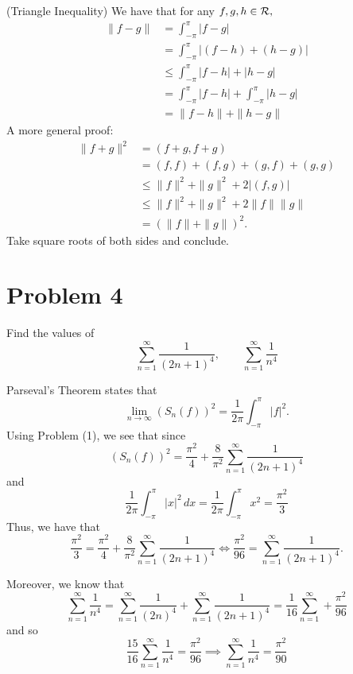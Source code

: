 \documentclass[11pt]{article}
\begin{document}
\begin{solution}
(Triangle Inequality) 
We have that for any $f,g,h \in \cal R,$
\begin{align*}
    \|f - g\| &= \int_{-\pi}^\pi |f - g|\\
    &= \int_{-\pi}^\pi |(f - h) + (h -g)|\\
    &\leq \int_{-\pi}^\pi |f - h| + |h - g|\\
    &= \int_{-\pi}^\pi |f - h| + \int_{-\pi}^\pi |h-g|\\
    &= \|f - h\| + \|h - g\|
\end{align*}
A more general proof:
\begin{align*}
\|f + g\|^2 &= (f + g, f + g)\\ &= (f,f) + (f,g)+ (g,f) + (g,g)\\ &\leq \|f\|^2 + \|g\|^2 + 2|(f,g)|\\ &\leq \|f\|^2 + \|g\|^2  + 2\|f\|    \|g\|\\
&= (\|f\| + \|g\|)^2.
\end{align*}
Take square roots of both sides and conclude.

\end{solution}


\newpage
\section*{Problem 4}
\begin{problem}
    Find the values of 
    \[\sum_{n=1}^\infty \frac{1}{(2n + 1)^4}, \qquad \sum_{n=1}^\infty \frac{1}{n^4}\]
\end{problem}
\begin{solution}
Parseval's Theorem states that 
\[\lim_{n\to \infty}(S_n(f))^2 = \frac{1}{2\pi}\int_{-\pi}^\pi |f|^2.\] Using Problem (1), we see that since 
\[(S_n(f))^2 = \frac{\pi^2}{4} + \frac{8}{\pi^2}\sum_{n=1}^\infty \frac{1}{(2n + 1)^4} \] and 
\[\frac{1}{2\pi}\int_{-\pi}^\pi |x|^2 \,dx = \frac{1}{2\pi}\int_{-\pi}^\pi x^2  = \frac{\pi^2}{3}\] Thus, we have that 
\[\frac{\pi^2}{3} = \frac{\pi^2}{4} + \frac{8}{\pi^2}\sum_{n=1}^\infty \frac{1}{(2n + 1)^4} \iff \frac{\pi^2}{96} = \sum_{n=1}^\infty \frac{1}{(2n + 1)^4}.\]

Moreover, we know that 
\[\sum_{n=1}^\infty \frac{1}{n^4} = \sum_{n=1}^\infty \frac{1}{(2n)^4} + \sum_{n=1}^\infty \frac{1}{(2n + 1)^4} = \frac{1}{16}\sum_{n=1}^\infty + \frac{\pi^2}{96}\] and so 
\[\frac{15}{16}\sum_{n=1}^\infty \frac{1}{n^4} = \frac{\pi^2}{96} \implies \sum_{n=1}^\infty \frac{1}{n^4} = \frac{\pi^2}{90}\]
\end{solution}
\end{document}
